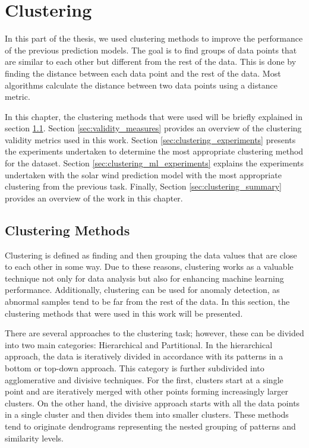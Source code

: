 \chapter{Clustering}\label{chap:clustering}

In this part of the thesis, we used clustering methods to improve the performance of the previous prediction models. The goal is to find groups of data points that are similar to each other but different from the rest of the data. This is done by finding the distance between each data point and the rest of the data. Most algorithms calculate the distance between two data points using a distance metric.

In this chapter, the clustering methods that were used will be briefly explained in section \ref{sec:clustering_methods}. Section \ref{sec:validity_measures} provides an overview of the clustering validity metrics used in this work. Section \ref{sec:clustering_experiments} presents the experiments undertaken to determine the most appropriate clustering method for the dataset. Section \ref{sec:clustering_ml_experiments} explains the experiments undertaken with the solar wind prediction model with the most appropriate clustering from the previous task. Finally, Section \ref{sec:clustering_summary} provides an overview of the work in this chapter.
%

\section{Clustering Methods}\label{sec:clustering_methods}
Clustering is defined as finding and then grouping the data values that are close to each other in some way. Due to these reasons, clustering works as a valuable technique not only for data analysis but also for enhancing machine learning performance. Additionally, clustering can be used for anomaly detection, as abnormal samples tend to be far from the rest of the data. In this section, the clustering methods that were used in this work will be presented.

There are several approaches to the clustering task; however, these can be divided into two main categories: Hierarchical and Partitional. In the hierarchical approach, the data is iteratively divided in accordance with its patterns in a bottom or top-down approach. This category is further subdivided into agglomerative and divisive techniques. For the first, clusters start at a single point and are iteratively merged with other points forming increasingly larger clusters. On the other hand, the divisive approach starts with all the data points in a single cluster and then divides them into smaller clusters. These methods tend to originate dendrograms representing the nested grouping of patterns and similarity levels. \cite{Jain.Murty.ea_Dataclusteringreview_1999a, Saxena.Prasad.ea_reviewclusteringtechniques_2017}

